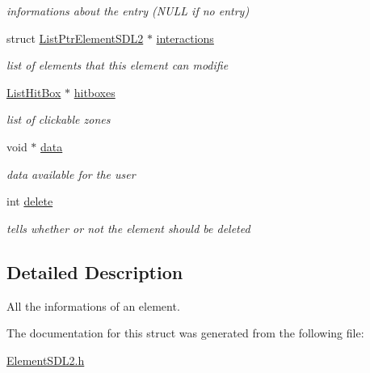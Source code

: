\begin{DoxyCompactItemize}
\begin{DoxyCompactList}\small\item\em informations about the entry (N\+U\+LL if no entry) \end{DoxyCompactList}\item 
struct \hyperlink{structListPtrElementSDL2}{List\+Ptr\+Element\+S\+D\+L2} $\ast$ \hyperlink{structElementSDL2_aca39f22199862196fc52dfcecafeca4a}{interactions}\hypertarget{structElementSDL2_aca39f22199862196fc52dfcecafeca4a}{}\label{structElementSDL2_aca39f22199862196fc52dfcecafeca4a}

\begin{DoxyCompactList}\small\item\em list of elements that this element can modifie \end{DoxyCompactList}\item 
\hyperlink{structListHitBox}{List\+Hit\+Box} $\ast$ \hyperlink{structElementSDL2_aa4af7ab8949d93544da609659a4011c0}{hitboxes}\hypertarget{structElementSDL2_aa4af7ab8949d93544da609659a4011c0}{}\label{structElementSDL2_aa4af7ab8949d93544da609659a4011c0}

\begin{DoxyCompactList}\small\item\em list of clickable zones \end{DoxyCompactList}\item 
void $\ast$ \hyperlink{structElementSDL2_abca7de78cc7e420d98d24a955563c7cc}{data}\hypertarget{structElementSDL2_abca7de78cc7e420d98d24a955563c7cc}{}\label{structElementSDL2_abca7de78cc7e420d98d24a955563c7cc}

\begin{DoxyCompactList}\small\item\em data available for the user \end{DoxyCompactList}\item 
int \hyperlink{structElementSDL2_a59d6b7086533d8d7da883bc882c4ef6d}{delete}\hypertarget{structElementSDL2_a59d6b7086533d8d7da883bc882c4ef6d}{}\label{structElementSDL2_a59d6b7086533d8d7da883bc882c4ef6d}

\begin{DoxyCompactList}\small\item\em tells whether or not the element should be deleted \end{DoxyCompactList}\end{DoxyCompactItemize}


\subsection{Detailed Description}
All the informations of an element. 

The documentation for this struct was generated from the following file\+:\begin{DoxyCompactItemize}
\item 
\hyperlink{ElementSDL2_8h}{Element\+S\+D\+L2.\+h}\end{DoxyCompactItemize}
